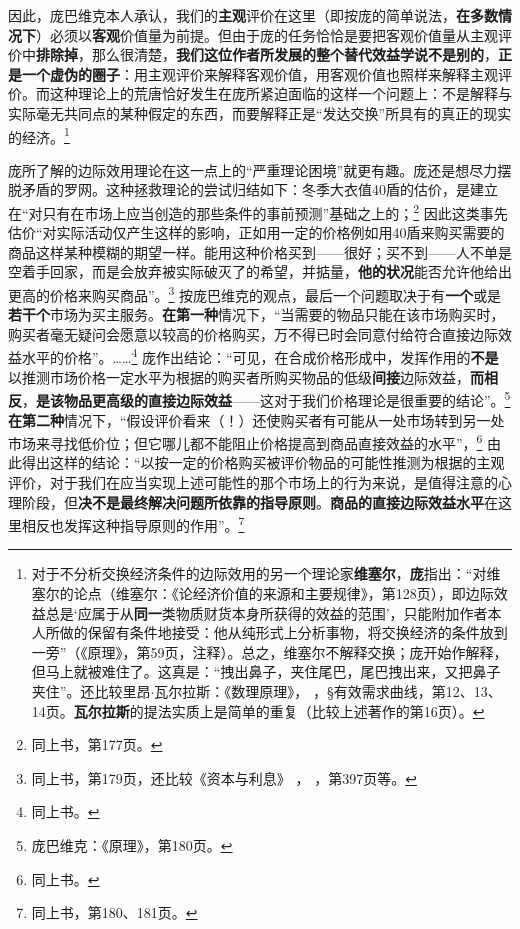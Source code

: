 \documentclass[fontset=fandol, a4paper, 12pt, openright]{ctexbook}
\newcommand{\RN}[1]{%
  \textup{\uppercase\expandafter{\romannumeral#1}}%
}
\begin{document}
因此，庞巴维克本人承认，我们的\textbf{主观}评价在这里（即按庞的简单说法，\textbf{在多数情况下}）必须以\textbf{客观}价值量为前提。但由于庞的任务恰恰是要把客观价值量从主观评价中\textbf{排除掉}，那么很清楚，\textbf{我们这位作者所发展的整个替代效益学说不是别的}，\textbf{正是一个虚伪的圈子}：用主观评价来解释客观价值，用客观价值也照样来解释主观评价。而这种理论上的荒唐恰好发生在庞所紧迫面临的这样一个问题上：不是解释与实际毫无共同点的某种假定的东西，而要解释正是“发达交换”所具有的真正的现实的经济。\footnote{对于不分析交换经济条件的边际效用的另一个理论家\textbf{维塞尔}，\textbf{庞}指出：“对维塞尔的论点（维塞尔：《论经济价值的来源和主要规律》，第128页），即边际效益总是‘应属于从\textbf{同一}类物质财货本身所获得的效益的范围’，只能附加作者本人所做的保留有条件地接受：他从纯形式上分析事物，将交换经济的条件放到一旁”（《原理》，第59页，注释）。总之，维塞尔不解释交换；庞开始作解释，但马上就被难住了。这真是：“拽出鼻子，夹住尾巴，尾巴拽出来，又把鼻子夹住”。还比较里昂$\cdot$瓦尔拉斯：《数理原理》，\RN{3}，§有效需求曲线，第12、13、14页。\textbf{瓦尔拉斯}的提法实质上是简单的重复（比较上述著作的第16页）。}

庞所了解的边际效用理论在这一点上的“严重理论困境”就更有趣。庞还是想尽力摆脱矛盾的罗网。这种拯救理论的尝试归结如下：冬季大衣值40盾的估价，是建立在“对只有在市场上应当创造的那些条件的事前预测”基础之上的；\footnote{同上书，第177页。} 因此这类事先估价“对实际活动仅产生这样的影响，正如用一定的价格例如用40盾来购买需要的商品这样某种模糊的期望一样。能用这种价格买到——很好；买不到——人不单是空着手回家，而是会放弃被实际破灭了的希望，并掂量，\textbf{他的状况}能否允许他给出更高的价格来购买商品”。\footnote{同上书，第179页，还比较《资本与利息》\RN{2}，\RN{1}，第397页等。} 按庞巴维克的观点，最后一个问题取决于有\textbf{一个}或是\textbf{若干个}市场为买主服务。\textbf{在第一种}情况下，“当需要的物品只能在该市场购买时，购买者毫无疑问会愿意以较高的价格购买，万不得已时会同意付给符合直接边际效益水平的价格”。……\footnote{同上书。} 庞作出结论：“可见，在合成价格形成中，发挥作用的\textbf{不是}以推测市场价格一定水平为根据的购买者所购买物品的低级\textbf{间接}边际效益，\textbf{而相反}，\textbf{是该物品更高级的直接边际效益}——这对于我们价格理论是很重要的结论”。\footnote{庞巴维克：《原理》，第180页。} \textbf{在第二种}情况下，“假设评价看来（！）还使购买者有可能从一处市场转到另一处市场来寻找低价位；但它哪儿都不能阻止价格提高到商品直接效益的水平”，\footnote{同上书。} 由此得出这样的结论：“以按一定的价格购买被评价物品的可能性推测为根据的主观评价，对于我们在应当实现上述可能性的那个市场上的行为来说，是值得注意的心理阶段，但\textbf{决不是最终解决问题所依靠的指导原则}。\textbf{商品的直接边际效益水平}在这里相反也发挥这种指导原则的作用”。\footnote{同上书，第180、181页。}
\end{document}
